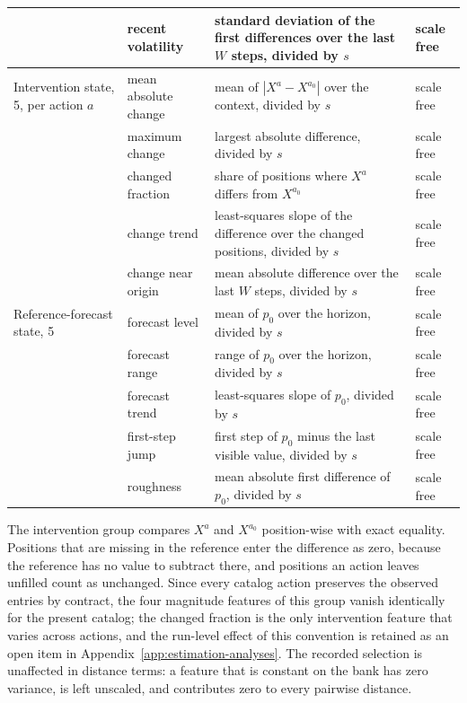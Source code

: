 \documentclass{article}
\begin{document}
\begin{table}[htbp]
{\begin{tabular}{@{}l p{} p{} p{}@{}}
     & recent volatility & standard deviation of the first differences over the last $W$ steps, divided by $s$ & scale free \\
    \midrule
    Intervention state, 5, per action $a$ & mean absolute change & mean of $|X^{a} - X^{a_0}|$ over the context, divided by $s$ & scale free \\
     & maximum change & largest absolute difference, divided by $s$ & scale free \\
     & changed fraction & share of positions where $X^{a}$ differs from $X^{a_0}$ & scale free \\
     & change trend & least-squares slope of the difference over the changed positions, divided by $s$ & scale free \\
     & change near origin & mean absolute difference over the last $W$ steps, divided by $s$ & scale free \\
    \midrule
    Reference-forecast state, 5 & forecast level & mean of $p_0$ over the horizon, divided by $s$ & scale free \\
     & forecast range & range of $p_0$ over the horizon, divided by $s$ & scale free \\
     & forecast trend & least-squares slope of $p_0$, divided by $s$ & scale free \\
     & first-step jump & first step of $p_0$ minus the last visible value, divided by $s$ & scale free \\
     & roughness & mean absolute first difference of $p_0$, divided by $s$ & scale free \\
    \bottomrule
  \end{tabular}}
\end{table}

The intervention group compares $X^{a}$ and $X^{a_0}$ position-wise with exact equality.
Positions that are missing in the reference enter the difference as zero, because the
reference has no value to subtract there, and positions an action leaves unfilled count as
unchanged. Since every catalog action preserves the observed entries by contract, the four
magnitude features of this group vanish identically for the present catalog; the changed
fraction is the only intervention feature that varies across actions, and the run-level
effect of this convention is retained as an open item in Appendix~\ref{app:estimation-analyses}. The recorded
selection is unaffected in distance terms: a feature that is constant on the bank has zero
variance, is left unscaled, and contributes zero to every pairwise distance.
\end{document}
